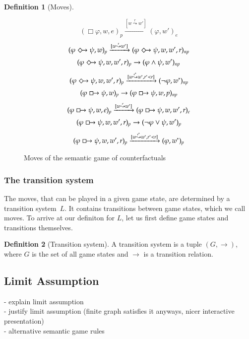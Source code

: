 \documentclass[a4paper,american]{paper}
\theoremstyle{definition}\newtheorem{definition}{Definition}
\begin{document}
\begin{definition}[Moves]
\begin{figure}[H]
\begin{equation}
		(\Box\varphi ,w,e)_{p}\xrightarrow{[w\overset{r}{\leadsto}w']} (\varphi ,w')_{e}
	\end{equation}
	\begin{equation}
		(\varphi\Diamondright\psi ,w)_{p}\xrightarrow{[w\overset{r}{\leadsto}w']} (\varphi\Diamondright\psi ,w,w',r)_{np}
	\end{equation}
	\begin{equation}
		(\varphi\Diamondright\psi ,w,w',r)_{p}\rightarrow (\varphi\wedge\psi ,w')_{np}
	\end{equation}
	\begin{equation}
		(\varphi\Diamondright\psi ,w,w',r)_{p}\xrightarrow{[w\overset{r^*}{\leadsto}w^*, r^*<r]} (\neg\varphi ,w^*)_{np}
	\end{equation}
	\begin{equation}
		(\varphi\boxright\psi ,w)_{p}\rightarrow (\varphi\boxright\psi ,w,p)_{np}
	\end{equation}
	\begin{equation}
		(\varphi\boxright\psi ,w,e)_{p}\xrightarrow{[w\overset{r}{\leadsto}w']} (\varphi\boxright\psi ,w,w',r)_{e}
	\end{equation}
	\begin{equation}
		(\varphi\boxright\psi ,w,w',r)_{p}\rightarrow (\neg\varphi\vee\psi ,w')_{p}
	\end{equation}
	\begin{equation}
		(\varphi\boxright\psi ,w,w',r)_{p}\xrightarrow{[w\overset{r^*}{\leadsto}w^*, r^*<r]} (\varphi ,w^*)_{p}
	\end{equation}
	\caption{Moves of the semantic game of counterfactuals}
	\label{fig:win_rules}
\end{figure}
\end{definition}
\subsubsection{The transition system}
The moves, that can be played in a given game state, are determined by a transition system~$L$. It contains transitions between game states, which we call moves. To arrive at our definiton for $L$, let us first define game states and transitions themselves.
\begin{definition}[Transition system]
A transition system is a tuple $(G,\rightarrow )$, where $G$ is the set of all game states and $\rightarrow$ is a transition relation.
\end{definition}
\subsection{Limit Assumption}
- explain limit assumption\\
- justify limit assumption (finite graph satisfies it anyways, nicer interactive presentation)\\
- alternative semantic game rules
\end{document}

